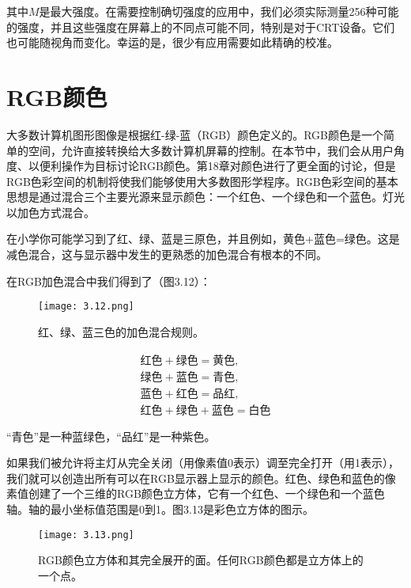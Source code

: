 \documentclass[lang=cn,12pt]{elegantbook}
\begin{document}
其中$M$是最大强度。在需要控制确切强度的应用中，我们必须实际测量256种可能的强度，并且这些强度在屏幕上的不同点可能不同，特别是对于CRT设备。它们也可能随视角而变化。幸运的是，很少有应用需要如此精确的校准。

\section{RGB颜色}

大多数计算机图形图像是根据红-绿-蓝（RGB）颜色定义的。RGB颜色是一个简单的空间，允许直接转换给大多数计算机屏幕的控制。在本节中，我们会从用户角度、以便利操作为目标讨论RGB颜色。第18章对颜色进行了更全面的讨论，但是RGB色彩空间的机制将使我们能够使用大多数图形学程序。RGB色彩空间的基本思想是通过混合三个主要光源来显示颜色：一个红色、一个绿色和一个蓝色。灯光以加色方式混合。

\begin{note}
在小学你可能学习到了红、绿、蓝是三原色，并且例如，黄色+蓝色=绿色。这是减色混合，这与显示器中发生的更熟悉的加色混合有根本的不同。
\end{note}

在RGB加色混合中我们得到了（图3.12）：

\begin{figure}[htb]
  \centering
  \texttt{[image: 3.12.png]}
  \caption{红、绿、蓝三色的加色混合规则。}
\end{figure}

\[
  \begin{aligned}
  \mbox{红色} + \mbox{绿色} = \mbox{黄色},\\
  \mbox{绿色} + \mbox{蓝色} = \mbox{青色},\\
  \mbox{蓝色} + \mbox{红色} = \mbox{品红},\\
  \mbox{红色} + \mbox{绿色} + \mbox{蓝色} = \mbox{白色}
  \end{aligned}
\]

“青色”是一种蓝绿色，“品红”是一种紫色。

如果我们被允许将主灯从完全关闭（用像素值0表示）调至完全打开（用1表示），我们就可以创造出所有可以在RGB显示器上显示的颜色。红色、绿色和蓝色的像素值创建了一个三维的RGB颜色立方体，它有一个红色、一个绿色和一个蓝色轴。轴的最小坐标值范围是0到1。图3.13是彩色立方体的图示。

\begin{figure}[htb]
  \centering
  \texttt{[image: 3.13.png]}
  \caption{RGB颜色立方体和其完全展开的面。任何RGB颜色都是立方体上的一个点。}
\end{figure}
\end{document}
